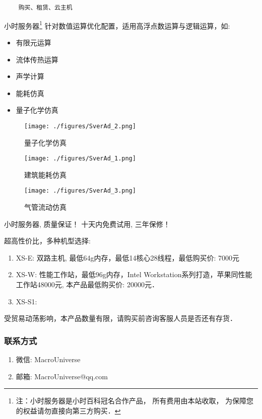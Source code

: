 
\begin{issues}
\issueDraft
\end{issues}



\begin{lstlisting}
    购买、租赁、云主机
\end{lstlisting}

小时服务器\footnote{注：小时服务器是小时百科冠名合作产品， 所有费用由本站收取， 为保障您的权益请勿直接向第三方购买．} 针对数值运算优化配置，适用高浮点数运算与逻辑运算，如:
\begin{itemize}
\item 有限元运算
\item 流体传热运算
\item 声学计算
\item 能耗仿真
\item 量子化学仿真
\end{itemize}
\begin{figure}[ht]
\centering
\texttt{[image: ./figures/SverAd\_2.png]}
\caption{量子化学仿真} \label{SverAd_fig2}
\end{figure}
\begin{figure}[ht]
\centering
\texttt{[image: ./figures/SverAd\_1.png]}
\caption{建筑能耗仿真} \label{SverAd_fig1}
\end{figure}
\begin{figure}[ht]
\centering
\texttt{[image: ./figures/SverAd\_3.png]}
\caption{气管流动仿真} \label{SverAd_fig3}
\end{figure}

小时服务器, 质量保证！ 十天内免费试用, 三年保修！

超高性价比，多种机型选择:
\begin{enumerate}
\item XS-E: 双路主机, 最低64g内存，最低14核心28线程，最低购买价: 7000元
\item XS-W: 性能工作站，最低96g内存，Intel Workstation系列打造，苹果同性能工作站48000元, 本产品最低购买价: 20000元．
\item XS-S1:

\end{enumerate}

受贸易动荡影响，本产品数量有限，请购买前咨询客服人员是否还有存货．
\subsubsection{联系方式}
\begin{enumerate}
\item 微信: MacroUniverse
\item 邮箱: MacroUniverse@qq.com
\end{enumerate}


